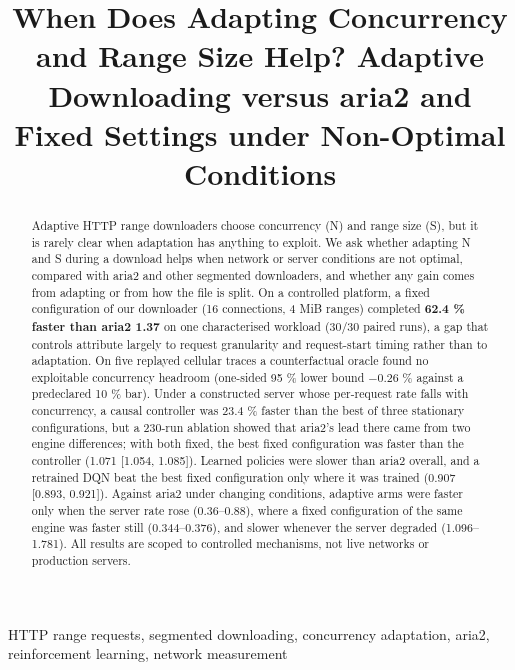 \documentclass[conference]{IEEEtran}
\begin{document}
\title{When Does Adapting Concurrency and Range Size Help? Adaptive Downloading versus aria2 and Fixed Settings under Non-Optimal Conditions}
\author{
\and
{}
\and
{}
}
\maketitle

\begin{abstract}Adaptive HTTP range downloaders choose concurrency (N) and range size (S), but it is rarely clear when adaptation has anything to exploit. We ask whether adapting N and S during a download helps when network or server conditions are not optimal, compared with aria2 and other segmented downloaders, and whether any gain comes from adapting or from how the file is split. On a controlled platform, a fixed configuration of our downloader (16 connections, 4 MiB ranges) completed \textbf{62.4 \% faster than aria2 1.37} on one characterised workload (30/30 paired runs), a gap that controls attribute largely to request granularity and request-start timing rather than to adaptation. On five replayed cellular traces a counterfactual oracle found no exploitable concurrency headroom (one-sided 95 \% lower bound −0.26 \% against a predeclared 10 \% bar). Under a constructed server whose per-request rate falls with concurrency, a causal controller was 23.4 \% faster than the best of three stationary configurations, but a 230-run ablation showed that aria2's lead there came from two engine differences; with both fixed, the best fixed configuration was faster than the controller (1.071 [1.054, 1.085]). Learned policies were slower than aria2 overall, and a retrained DQN beat the best fixed configuration only where it was trained (0.907 [0.893, 0.921]). Against aria2 under changing conditions, adaptive arms were faster only when the server rate rose (0.36–0.88), where a fixed configuration of the same engine was faster still (0.344–0.376), and slower whenever the server degraded (1.096–1.781). All results are scoped to controlled mechanisms, not live networks or production servers.\end{abstract}
\begin{IEEEkeywords}HTTP range requests, segmented downloading, concurrency adaptation, aria2, reinforcement learning, network measurement\end{IEEEkeywords}
\end{document}
